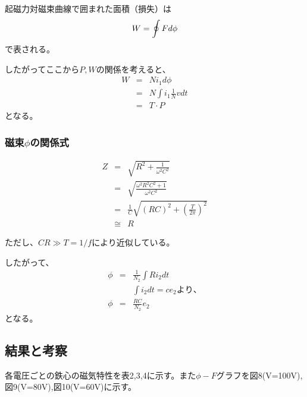 \documentclass[11pt,a4j]{jsarticle}
\begin{document}
  起磁力対磁束曲線で囲まれた面積（損失）は
  \begin{equation}
   W = \oint F d\phi \\
  \end{equation}
  で表される。
  
  したがってここから$P,W$の関係を考えると、
  \begin{eqnarray}
   W &=& N i_1 d\phi \nonumber \\
     &=& N \int i_1 \frac{1}{N} v dt \nonumber \\
     &=& T \cdot P
  \end{eqnarray}
  となる。

  \subsubsection{磁束$\phi$の関係式}
   
   \begin{eqnarray}
    Z &=& \sqrt{R^2 + \frac{1}{\omega^2 C^2}} \nonumber \\
      &=& \sqrt{\frac{\omega^2 R^2 C^2 + 1}{\omega^2 C^2}} \nonumber \\
      &=& \frac{1}{C} \sqrt{(RC)^2 + (\frac{T}{2\pi})^2} \nonumber \\
      &\cong& R
   \end{eqnarray}
   
   ただし、$CR\gg T = 1/f$により近似している。

   したがって、
   \begin{eqnarray}
    \phi &=& \frac{1}{N_2} \int Ri_2 dt \nonumber \\
         && \int i_2 dt = ce_2 より、 \nonumber \\
    \phi &=& \frac{RC}{N_2} e_2
   \end{eqnarray}
    となる。
  

  \subsection{結果と考察}
  
    
  各電圧ごとの鉄心の磁気特性を表2,3,4に示す。また$\phi-F$グラフを図8(V=100V),図9(V=80V),図10(V=60V)に示す。
  
\end{document}
